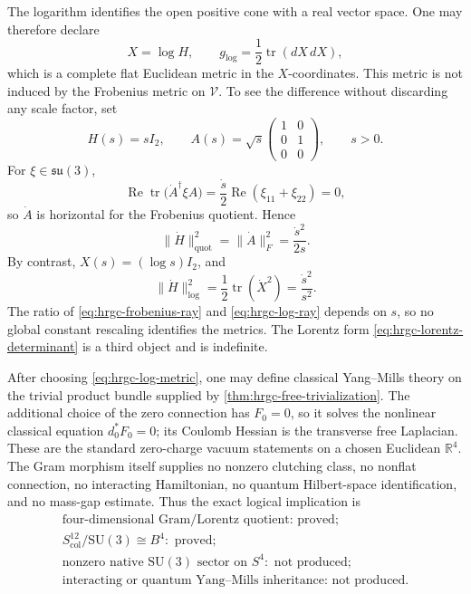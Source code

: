 The logarithm identifies the open positive cone with a real vector space.
One may therefore declare
\begin{equation}
 X=\log H,
 \qquad
 g_{\log}=\frac12\operatorname{tr}(dX\,dX),
 \label{eq:hrgc-log-metric}
\end{equation}
which is a complete flat Euclidean metric in the \(X\)-coordinates.  This
metric is not induced by the Frobenius metric on \(\mathscr V\).  To see the
difference without discarding any scale factor, set
\[
 H(s)=sI_2,
 \qquad
 A(s)=\sqrt{s}\begin{pmatrix}1&0\\0&1\\0&0\end{pmatrix},
 \qquad s>0.
\]
For \(\xi\in\mathfrak{su}(3)\),
\[
 \operatorname{Re}\operatorname{tr}
 \bigl(\dot A^\dagger\xi A\bigr)
 =\frac{\dot s}{2}
 \operatorname{Re}(\xi_{11}+\xi_{22})=0,
\]
so \(\dot A\) is horizontal for the Frobenius quotient.  Hence
\begin{equation}
 \lVert\dot H\rVert_{\mathrm{quot}}^2
 =\lVert\dot A\rVert_F^2=\frac{\dot s^2}{2s}.
 \label{eq:hrgc-frobenius-ray}
\end{equation}
By contrast, \(X(s)=(\log s)I_2\), and
\begin{equation}
 \lVert\dot H\rVert_{\log}^2
 =\frac12\operatorname{tr}(\dot X^2)
 =\frac{\dot s^2}{s^2}.
 \label{eq:hrgc-log-ray}
\end{equation}
The ratio of \eqref{eq:hrgc-frobenius-ray} and
\eqref{eq:hrgc-log-ray} depends on \(s\), so no global constant rescaling
identifies the metrics.  The Lorentz form
\eqref{eq:hrgc-lorentz-determinant} is a third object and is indefinite.

After choosing \eqref{eq:hrgc-log-metric}, one may define classical
Yang--Mills theory on the trivial product bundle supplied by
\cref{thm:hrgc-free-trivialization}.  The additional choice of the zero
connection has \(F_0=0\), so it solves the nonlinear classical equation
\(d_0^*F_0=0\); its Coulomb Hessian is the transverse free Laplacian.  These
are the standard zero-charge vacuum statements on a chosen Euclidean
\(\mathbb R^4\).  The Gram morphism itself supplies no nonzero clutching
class, no nonflat connection, no interacting Hamiltonian, no quantum
Hilbert-space identification, and no mass-gap estimate.  Thus the exact
logical implication is
\[
 \boxed{
 \begin{array}{c}
 \text{four-dimensional Gram/Lorentz quotient: proved;}\\
 S^{12}_{\mathrm{col}}/\mathrm{SU}(3)\cong B^4: \text{ proved;}\\
 \text{nonzero native }\mathrm{SU}(3)\text{ sector on }S^4:
 \text{ not produced;}\\
 \text{interacting or quantum Yang--Mills inheritance: not produced.}
 \end{array}}
\]
